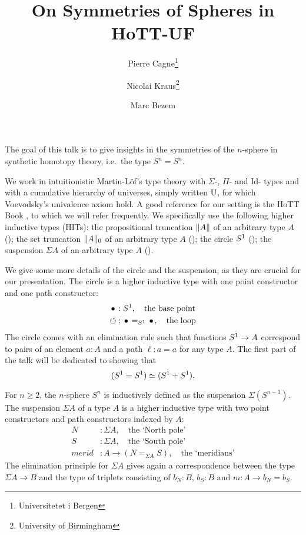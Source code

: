 \documentclass{easychair}
\title{On Symmetries of Spheres in HoTT-UF}%
\author{Pierre Cagne\thanks{Universitetet i Bergen} \and Nicolai
  Kraus\thanks{University of Birmingham} \and Marc
  Bezem\footnotemark[1]{}}%
\institute{
}
\newcommand{\mrd}{\mathit{merid}}%
\newcommand{\susp}[1]{\Sigma{#1}}%
\def\U{\universe U}%
\begin{document}
\maketitle

The goal of this talk is to give insights in the symmetries of the
$n$-sphere in synthetic homotopy theory, i.e.\ the type $S^n = S^n$.

We work in intuitionistic Martin-Löf's type theory with $\Sigma$-,
$\Pi$- and $\mathrm{Id}$- types and with a cumulative hierarchy of
universes, simply written $\U$, for which Voevodsky's univalence axiom
hold.  A good reference for our setting is the HoTT Book \cite{HoTT},
to which we will refer frequently. We specifically use the following
higher inductive types (HITs): the propositional truncation
$\lVert A\rVert$ of an arbitrary type $A$ (\cite[Ch.~3.7]{HoTT}); the set
truncation $\lVert A\rVert_0$ of an arbitrary type $A$
(\cite[Ch.~6.9]{HoTT}); the circle ${S^1}$ (\cite[Ch.~6.4]{HoTT}); the
suspension $\susp A$ of an arbitrary type $A$ (\cite[Ch.~6.5]{HoTT}).


We give some more details of the circle and the suspension, as they
are crucial for our presentation. The circle is a higher inductive
type with one point constructor and one path constructor:
\begin{align*}
  \base &: \Sc,  \quad\text{the base point}\\
  \Sloop &: \base =_{\Sc} \base,  \quad\text{the loop}
\end{align*}
The circle comes with an elimination rule such that functions
${S^1} \to A$ correspond to pairs of an element $a:A$ and a path
$\ell: a=a$ for any type $A$. The first part of the talk will be
dedicated to showing that
\begin{equation}
  \label{eq:s1-result}%
  (\Sc = \Sc) \weq (\Sc+\Sc).
\end{equation}

For $n\geq 2$, the $n$-sphere $S^n$ is inductively defined as the
suspension $\susp {(S^{n-1})}$. The suspension $\susp A$ of a type $A$
is a higher inductive type with two point constructors and path
constructors indexed by $A$:
\begin{align*}
  \label{eq:suspension}
  N &: \susp A, \quad\text{the `North pole'}\\
  S &: \susp A, \quad\text{the `South pole'}\\
  \mrd &: A \to (N =_{\susp A} S), \quad\text{the `meridians'}
\end{align*}
The elimination principle for $\susp A$ gives again a correspondence
between the type $\susp A \to B$ and the type of triplets consisting
of $b_N: B$, $b_S: B$ and $m: A \to b_N=b_S$.
\end{document}
